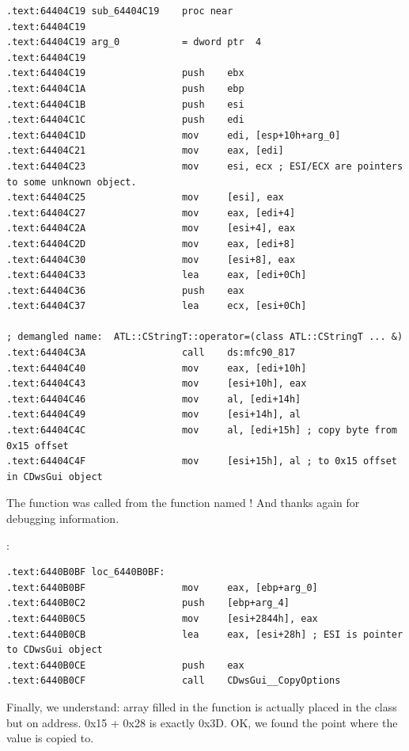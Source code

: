 \begin{lstlisting}
.text:64404C19 sub_64404C19    proc near
.text:64404C19
.text:64404C19 arg_0           = dword ptr  4
.text:64404C19
.text:64404C19                 push    ebx
.text:64404C1A                 push    ebp
.text:64404C1B                 push    esi
.text:64404C1C                 push    edi
.text:64404C1D                 mov     edi, [esp+10h+arg_0]
.text:64404C21                 mov     eax, [edi]
.text:64404C23                 mov     esi, ecx ; ESI/ECX are pointers to some unknown object.
.text:64404C25                 mov     [esi], eax
.text:64404C27                 mov     eax, [edi+4]
.text:64404C2A                 mov     [esi+4], eax
.text:64404C2D                 mov     eax, [edi+8]
.text:64404C30                 mov     [esi+8], eax
.text:64404C33                 lea     eax, [edi+0Ch]
.text:64404C36                 push    eax
.text:64404C37                 lea     ecx, [esi+0Ch]

; demangled name:  ATL::CStringT::operator=(class ATL::CStringT ... &)
.text:64404C3A                 call    ds:mfc90_817 
.text:64404C40                 mov     eax, [edi+10h]
.text:64404C43                 mov     [esi+10h], eax
.text:64404C46                 mov     al, [edi+14h]
.text:64404C49                 mov     [esi+14h], al
.text:64404C4C                 mov     al, [edi+15h] ; copy byte from 0x15 offset
.text:64404C4F                 mov     [esi+15h], al ; to 0x15 offset in CDwsGui object
\end{lstlisting}

{The function was called from the function named ! And thanks again for debugging information.}

 :

\begin{lstlisting}
.text:6440B0BF loc_6440B0BF:
.text:6440B0BF                 mov     eax, [ebp+arg_0]
.text:6440B0C2                 push    [ebp+arg_4]
.text:6440B0C5                 mov     [esi+2844h], eax
.text:6440B0CB                 lea     eax, [esi+28h] ; ESI is pointer to CDwsGui object
.text:6440B0CE                 push    eax
.text:6440B0CF                 call    CDwsGui__CopyOptions
\end{lstlisting}

{Finally, we understand: array filled in the  function is actually placed in the  class 
but on  address. 0x15 + 0x28 is exactly 0x3D. OK, we found the point where the value is copied to.}

